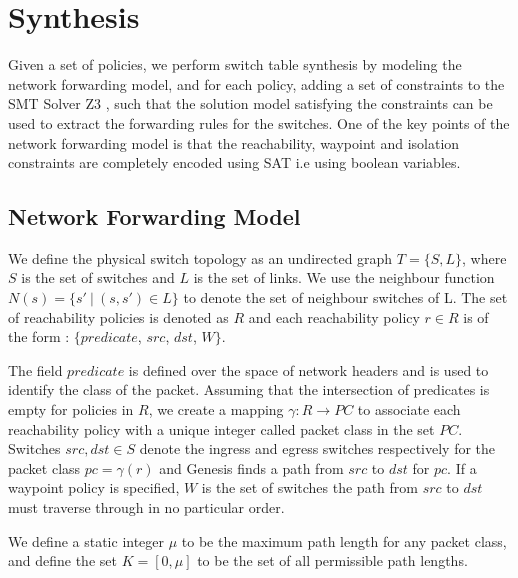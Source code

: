 \documentclass[]{sig}
\begin{document}
\section{Synthesis}
Given a set of policies, we perform switch table synthesis by modeling the network forwarding model, and for each policy, adding a set of constraints to the SMT Solver Z3 \cite{z3}, such that the solution model satisfying the constraints can be used to extract the forwarding rules for the switches. One of the key points of the network forwarding model is that the reachability, waypoint and isolation constraints are completely encoded using SAT i.e using boolean variables. 
\subsection{Network Forwarding Model} \label{sec:fwdmodel}
We define the physical switch topology as an undirected graph $T=\{S, L\}$, where $S$ is the set of switches and $L$ is the set of links. We use the neighbour function $N(s) = \{s'\ | \ (s,s') \in L \}$ to denote the set of neighbour switches of L. The set of reachability policies is denoted as $R$ and each reachability policy $r \in R$ is of the form : $\{predicate$, $src$, $dst$, $W\}$. 

The field $predicate$ is defined over the space of network headers and is used to identify the class of the packet. Assuming that the intersection of predicates is empty for policies in $R$, we create a mapping $\gamma : R \rightarrow PC$ to associate each reachability policy with a unique integer called packet class in the set $PC$. Switches $src, dst \in S$ denote the ingress and egress switches respectively for the packet class $pc = \gamma(r)$ and Genesis finds a path from $src$ to $dst$ for $pc$. If a waypoint policy is specified, $W$ is the set of switches the path from $src$ to $dst$ must traverse through in no particular order.

We define a static integer $\mu$ to be the maximum path length for any packet class, and define the set $K = [0, \mu]$ to be the set of all permissible path lengths.
\end{document}
